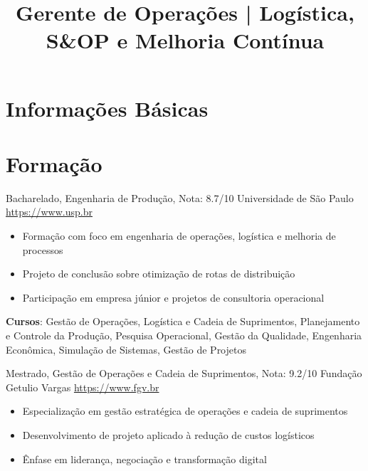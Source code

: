 \documentclass[a4paper, serif, 10pt]{moderncv}
\title{Gerente de Operações | Logística, S\&OP e Melhoria Contínua}
\begin{document}
\maketitle

\section{Informações Básicas}

\section{Formação}

        {Bacharelado, Engenharia de Produção, Nota: 8.7/10}
        {Universidade de São Paulo}
        {\url{https://www.usp.br}}
        {}
        {\begin{itemize}
\item Formação com foco em engenharia de operações, logística e melhoria de processos
\item Projeto de conclusão sobre otimização de rotas de distribuição
\item Participação em empresa júnior e projetos de consultoria operacional
\end{itemize}
\textbf{Cursos}: Gestão de Operações, Logística e Cadeia de Suprimentos, Planejamento e Controle da Produção, Pesquisa Operacional, Gestão da Qualidade, Engenharia Econômica, Simulação de Sistemas, Gestão de Projetos}

        {Mestrado, Gestão de Operações e Cadeia de Suprimentos, Nota: 9.2/10}
        {Fundação Getulio Vargas}
        {\url{https://www.fgv.br}}
        {}
        {\begin{itemize}
\item Especialização em gestão estratégica de operações e cadeia de suprimentos
\item Desenvolvimento de projeto aplicado à redução de custos logísticos
\item Ênfase em liderança, negociação e transformação digital
\end{itemize}}
\end{document}
